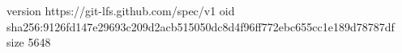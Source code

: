 version https://git-lfs.github.com/spec/v1
oid sha256:9126fd147e29693c209d2acb515050dc8d4f96ff772ebc655cc1e189d78787df
size 5648

